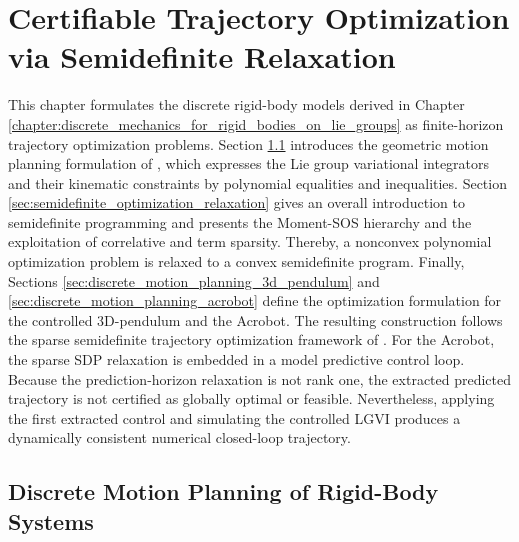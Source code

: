 \chapter{Certifiable Trajectory Optimization via Semidefinite Relaxation}
\label{chapter:certifiable_trajectory_optimization}

This chapter formulates the discrete rigid-body models derived in 
Chapter \ref{chapter:discrete_mechanics_for_rigid_bodies_on_lie_groups} as 
finite-horizon trajectory optimization problems. Section \ref{sec:discrete_motion_planning_of_rigid_body_systems} 
introduces the geometric motion planning 
formulation of \cite{Sangli2025}, which expresses the Lie group variational 
integrators and their kinematic constraints by polynomial equalities and inequalities. 
Section \ref{sec:semidefinite_optimization_relaxation} gives an 
overall introduction to semidefinite programming and presents the 
Moment-SOS hierarchy and the exploitation of correlative and term sparsity. 
Thereby, a nonconvex polynomial optimization problem is relaxed to a convex semidefinite 
program.
Finally, Sections \ref{sec:discrete_motion_planning_3d_pendulum} and 
\ref{sec:discrete_motion_planning_acrobot} define the optimization formulation for 
the controlled 3D-pendulum and the Acrobot. The resulting construction follows the sparse 
semidefinite trajectory optimization framework of \cite{Kang_2026Fast,Kang_2025Global}.
For the Acrobot, the sparse SDP relaxation is embedded in a model predictive control loop. 
Because the prediction-horizon relaxation is not rank one, the extracted predicted trajectory 
is not certified as globally optimal or feasible. Nevertheless, applying the first extracted 
control and simulating the controlled LGVI produces a 
dynamically consistent numerical closed-loop trajectory.

\section{Discrete Motion Planning of Rigid-Body Systems}
\label{sec:discrete_motion_planning_of_rigid_body_systems}

